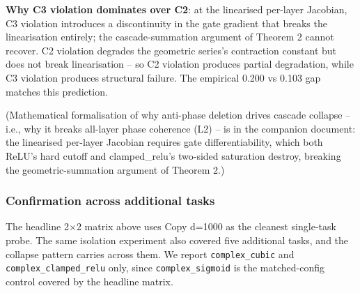 \documentclass[11pt,a4paper]{article}
\theoremstyle{plain}
\theoremstyle{definition}
\begin{document}
\textbf{Why C3 violation dominates over C2}: at the linearised per-layer Jacobian, C3 violation introduces a discontinuity in the gate gradient that breaks the linearisation entirely; the cascade-summation argument of Theorem 2 cannot recover. C2 violation degrades the geometric series's contraction constant but does not break linearisation -- so C2 violation produces partial degradation, while C3 violation produces structural failure. The empirical 0.200 vs 0.103 gap matches this prediction.

(Mathematical formalisation of why anti-phase deletion drives cascade collapse -- i.e., why it breaks all-layer phase coherence (L2) -- is in the companion document: the linearised per-layer Jacobian requires gate differentiability, which both ReLU's hard cutoff and clamped\_relu's two-sided saturation destroy, breaking the geometric-summation argument of Theorem 2.)

\subsubsection{Confirmation across additional tasks}
\noindent
\begin{minipage}[t]{0.49\textwidth}
\vspace{0pt}
The headline 2$\times$2 matrix above uses Copy d=1000 as the cleanest single-task probe. The same isolation experiment also covered five additional tasks, and the collapse pattern carries across them. We report \texttt{complex\_cubic} and \texttt{complex\_clamped\_relu} only, since \texttt{complex\_sigmoid} is the matched-config control covered by the headline matrix.
\end{minipage}\hspace{0.03\textwidth}%
\begin{minipage}[t]{0.43\textwidth}
\vspace{0pt}
\centering
{\footnotesize
\setlength{\tabcolsep}{3pt}
\renewcommand{\arraystretch}{1.05}
}
\end{minipage}
\par\medskip
\end{document}
